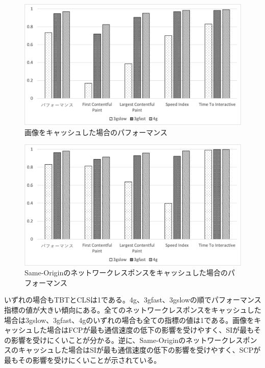 \begin{figure}
  \centering
  \includegraphics[width=\textwidth]{images/service_worker_cache_images.png}
  \caption{画像をキャッシュした場合のパフォーマンス}\label{figure:画像をキャッシュした場合のパフォーマンス}
\end{figure}
\begin{figure}
  \centering
  \includegraphics[width=\textwidth]{images/service_worker_cache_same_origin.png}
  \caption{Same-Originのネットワークレスポンスをキャッシュした場合のパフォーマンス}\label{figure:Same-Originのネットワークレスポンスをキャッシュした場合のパフォーマンス}
\end{figure}
いずれの場合もTBTとCLSは1である。4g、3gfast、3gslowの順でパフォーマンス指標の値が大きい傾向にある。全てのネットワークレスポンスをキャッシュした場合は3gslow、3gfast、4gのいずれの場合も全ての指標の値は1である。画像をキャッシュした場合はFCPが最も通信速度の低下の影響を受けやすく、SIが最もその影響を受けにくいことが分かる。逆に、Same-Originのネットワークレスポンスのキャッシュした場合はSIが最も通信速度の低下の影響を受けやすく、SCPが最もその影響を受けにくいことが示されている。


